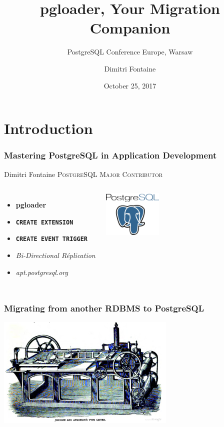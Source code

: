 \documentclass{beamer}
\title{pgloader, Your Migration Companion}
\subtitle{PostgreSQL Conference Europe, Warsaw}
\author{Dimitri Fontaine}
\institute{\href{http://MasteringPostgreSQL.com/}{Mastering PostgreSQL}}
\date{October 25, 2017}
\begin{document}
\section{Introduction}

\frame{\titlepage}

\begin{frame}[fragile]
  \frametitle{Mastering PostgreSQL in Application Development}

  \begin{center}
    {\Huge Dimitri Fontaine}
    \vfill
    {\Large \textsc{PostgreSQL Major Contributor}}
  \end{center}

\begin{columns}[c]

  \begin{itemize}
   \item \textbf{pgloader}
   \item \texttt{\textbf{CREATE EXTENSION}}
   \item \texttt{\textbf{CREATE EVENT TRIGGER}}
   \item \textit{Bi-Directional Réplication}
   \item \textit{apt.postgresql.org}
  \end{itemize}  

\begin{center}
  \includegraphics[height=6em]{postgres-logo.png}
\end{center}
\end{columns}
\end{frame}

\begin{frame}
  \frametitle{Migrating from another RDBMS to PostgreSQL}

  \begin{center}
    \includegraphics[height=2.1in]{TypeCaster.jpg}
  \end{center}
\end{frame}
\end{document}
